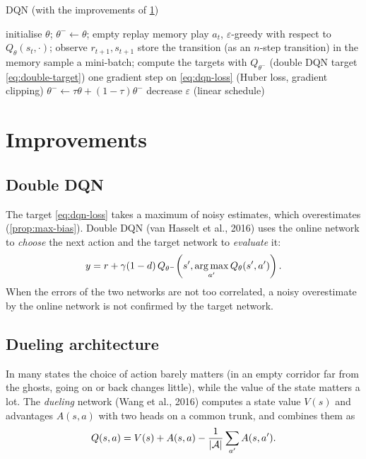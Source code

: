 \begin{algobox}{DQN (with the improvements of \cref{sec:dqn-improvements})}
  \begin{algorithmic}[1]
    \State initialise $\theta$; $\theta^- \gets \theta$; empty replay memory
      \State play $a_t$, $\varepsilon$-greedy with respect to
        $Q_\theta(s_t, \cdot)$; observe $r_{t+1}, s_{t+1}$
      \State store the transition (as an $n$-step transition) in the memory
      \State sample a mini-batch; compute the targets with $Q_{\theta^-}$
        (double DQN target \eqref{eq:double-target})
      \State one gradient step on \eqref{eq:dqn-loss} (Huber loss, gradient
        clipping)
      \State $\theta^- \gets \tau \theta + (1 - \tau) \theta^-$
      \State decrease $\varepsilon$ (linear schedule)
    \EndFor
  \end{algorithmic}
\end{algobox}

\section{Improvements}
\label{sec:dqn-improvements}

\subsection{Double DQN}

The target \eqref{eq:dqn-loss} takes a maximum of noisy estimates, which
overestimates (\cref{prop:max-bias}). Double DQN (van Hasselt et al., 2016)
uses the online network to \emph{choose} the next action and the target
network to \emph{evaluate} it:
\begin{equation}
  \label{eq:double-target}
  y = r + \gamma (1 - d)\, Q_{\theta^-}\!\left(s', \operatorname*{arg\,max}_{a'}
    Q_\theta(s', a')\right).
\end{equation}
When the errors of the two networks are not too correlated, a noisy
overestimate by the online network is not confirmed by the target network.

\subsection{Dueling architecture}

In many states the choice of action barely matters (in an empty corridor
far from the ghosts, going on or back changes little), while the value of
the state matters a lot. The \emph{dueling} network (Wang et al., 2016)
computes a state value $V(s)$ and advantages $A(s, a)$ with two heads on a
common trunk, and combines them as
\begin{equation}
  \label{eq:dueling}
  Q(s, a) = V(s) + A(s, a) - \frac{1}{\left\lvert \mathcal{A} \right\rvert} \sum_{a'} A(s, a').
\end{equation}


